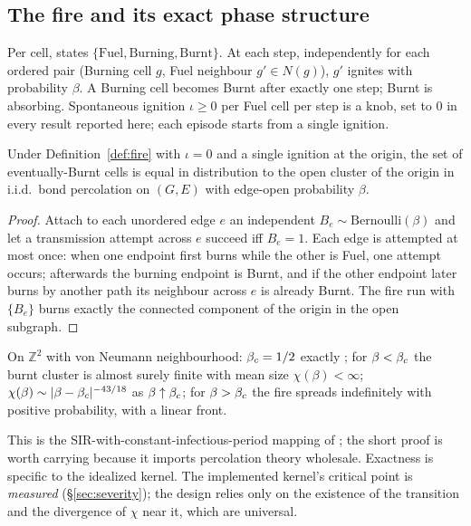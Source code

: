 \subsection{The fire and its exact phase structure}

\begin{definition}
\label{def:fire}
Per cell, states $\{\mathrm{Fuel}, \mathrm{Burning}, \mathrm{Burnt}\}$. At each
step, independently for each ordered pair (Burning cell $g$, Fuel neighbour
$g' \in N(g)$), $g'$ ignites with probability $\beta$. A Burning cell becomes
Burnt after exactly one step; Burnt is absorbing. Spontaneous ignition
$\iota \ge 0$ per Fuel cell per step is a knob, set to $0$ in every result
reported here; each episode starts from a single ignition.
\end{definition}

\begin{proposition}
\label{prop:perc}
Under Definition~\ref{def:fire} with $\iota = 0$ and a single ignition at the
origin, the set of eventually-Burnt cells is equal in distribution to the open
cluster of the origin in i.i.d.\ bond percolation on $(G,E)$ with edge-open
probability $\beta$.
\end{proposition}
\begin{proof}
Attach to each unordered edge $e$ an independent $B_e \sim
\mathrm{Bernoulli}(\beta)$ and let a transmission attempt across $e$ succeed
iff $B_e = 1$. Each edge is attempted at most once: when one endpoint first
burns while the other is Fuel, one attempt occurs; afterwards the burning
endpoint is Burnt, and if the other endpoint later burns by another path its
neighbour across $e$ is already Burnt. The fire run with $\{B_e\}$ burns
exactly the connected component of the origin in the open subgraph.
\end{proof}

\begin{corollary}
\label{cor:phase}
On $\mathbb{Z}^2$ with von Neumann neighbourhood: $\beta_c = 1/2$ exactly
\citep{kesten1980}; for $\beta < \beta_c$ the burnt cluster is almost surely
finite with mean size $\chi(\beta) < \infty$; $\chi(\beta) \sim
|\beta-\beta_c|^{-43/18}$ as $\beta \uparrow \beta_c$; for $\beta > \beta_c$ the
fire spreads indefinitely with positive probability, with a linear front.
\end{corollary}

This is the SIR-with-constant-infectious-period mapping of
\citet{grassberger1983}; the short proof is worth carrying because it imports
percolation theory wholesale. Exactness is specific to the idealized kernel.
The implemented kernel's critical point is \emph{measured}
(\S\ref{sec:severity}); the design relies only on the existence of the
transition and the divergence of $\chi$ near it, which are universal.

